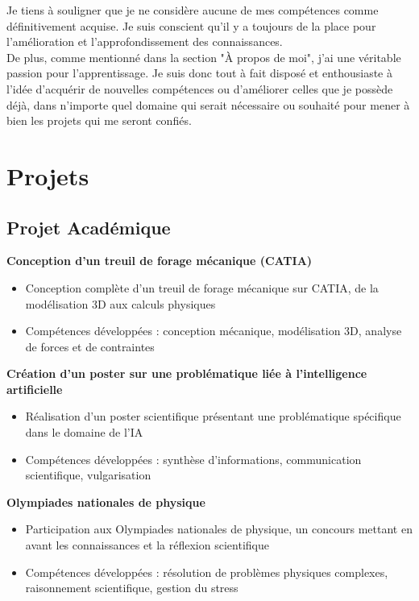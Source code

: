 \documentclass{article}
\begin{document}
Je tiens à souligner que je ne considère aucune de mes compétences comme définitivement acquise. 
Je suis conscient qu'il y a toujours de la place pour l'amélioration et l'approfondissement des connaissances.\\
De plus, comme mentionné dans la section "À propos de moi", 
j'ai une véritable passion pour l'apprentissage. Je suis donc 
tout à fait disposé et enthousiaste à l'idée d'acquérir de 
nouvelles compétences ou d'améliorer celles que je possède déjà, 
dans n'importe quel domaine qui serait nécessaire ou souhaité pour mener à bien les projets 
qui me seront confiés.\\

\section{Projets}
\subsection{Projet Académique}
\textbf{Conception d'un treuil de forage mécanique (CATIA)}
\begin{itemize}
\item Conception complète d'un treuil de forage mécanique sur CATIA, de la modélisation 3D aux calculs physiques
\item Compétences développées : conception mécanique, modélisation 3D, analyse de forces et de contraintes
\end{itemize}

\textbf{Création d'un poster sur une problématique liée à l'intelligence artificielle}
\begin{itemize}
\item Réalisation d'un poster scientifique présentant une problématique spécifique dans le domaine de l'IA
\item Compétences développées : synthèse d'informations, communication scientifique, vulgarisation
\end{itemize}

\textbf{Olympiades nationales de physique}
\begin{itemize}
\item Participation aux Olympiades nationales de physique, un concours mettant en avant les connaissances et la réflexion scientifique
\item Compétences développées : résolution de problèmes physiques complexes, raisonnement scientifique, gestion du stress
\end{itemize}
\end{document}
